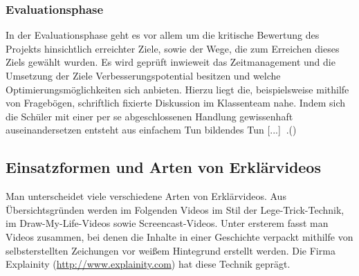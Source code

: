 \documentclass[a4paper,12pt,twoside=false]{scrartcl}
\begin{document}
\subsubsection{Evaluationsphase}
In der Evaluationsphase geht es vor allem um die kritische Bewertung des Projekts hinsichtlich erreichter Ziele, sowie der Wege, die zum Erreichen dieses Ziels gewählt wurden. Es wird geprüft inwieweit das Zeitmanagement und die Umsetzung der Ziele Verbesserungspotential besitzen und welche Optimierungsmöglichkeiten sich anbieten. Hierzu liegt die, beispielsweise mithilfe von Fragebögen, schriftlich fixierte Diskussion im Klassenteam nahe. Indem sich die Schüler mit einer per se abgeschlossenen Handlung gewissenhaft auseinandersetzen entsteht \glqq aus einfachem Tun bildendes Tun [...] \grqq$~$.(\cite{Frey})



\subsection{Einsatzformen und Arten von Erklärvideos}
Man unterscheidet viele verschiedene Arten von Erklärvideos. Aus Übersichtsgründen werden im Folgenden Videos im Stil der Lege-Trick-Technik, im Draw-My-Life-Videos sowie Screencast-Videos.
Unter ersterem fasst man Videos zusammen, bei denen die Inhalte in einer Geschichte verpackt mithilfe von selbsterstellten Zeichungen vor weißem Hintegrund erstellt werden. Die Firma Explainity (\url{http://www.explainity.com}) hat diese Technik geprägt. 
\end{document}

